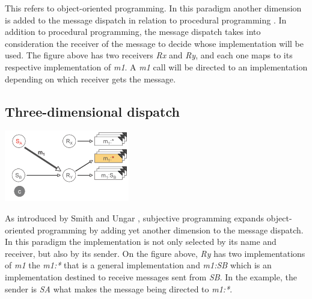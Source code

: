 \documentclass[journal,10pt,compsoc]{IEEEtran}
\begin{document}
This refers to object-oriented programming. In this paradigm another dimension is added to the message dispatch in relation to procedural programming  \cite{smith1996simple}.
In addition to procedural programming, the message dispatch takes into consideration the receiver of the message to decide whose implementation will be used. The figure above has two receivers 
\emph{Rx} and \emph{Ry}, and each one maps to its respective implementation of \emph{m1}. A \emph{m1} call will be directed to an implementation depending on which receiver gets the message.

\subsection{Three-dimensional dispatch}
\label{sec:org30e8e0a}
\begin{center}
\includegraphics[width=.9\linewidth]{./three.png}
\end{center}

As introduced by Smith and Ungar \cite{smith1996simple}, subjective programming expands object-oriented programming by adding yet another dimension to the message dispatch. 
In this paradigm the implementation is not only selected by its name and receiver, but also by its sender. On the figure above, \emph{Ry} has two implementations of \emph{m1} the \emph{m1:*} 
that is a general implementation and \emph{m1:SB} which is an implementation destined to receive messages sent from \emph{SB}. In the example, the sender is \emph{SA} what makes the message 
being directed to \emph{m1:*}.
\end{document}
